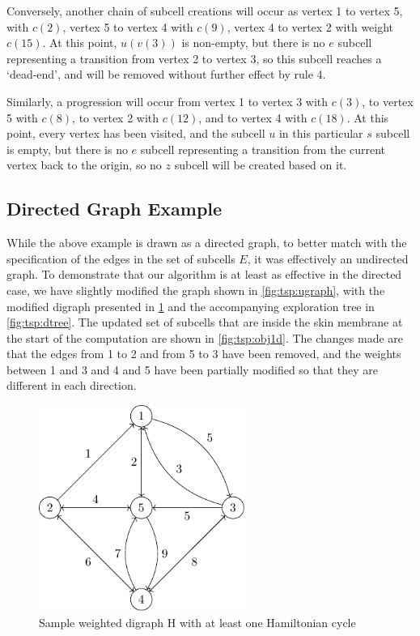 Conversely, another chain of subcell creations will occur as vertex 1 to vertex 5, with \(c(2)\), vertex 5 to vertex 4 with \(c(9)\), vertex 4 to vertex 2 with weight \(c(15)\).  At this point, \(u(v(3))\) is non-empty, but there is no \(e\) subcell representing a transition from vertex 2 to vertex 3, so this subcell reaches a `dead-end', and will be removed without further effect by rule 4.

Similarly, a progression will occur from vertex 1 to vertex 3 with \(c(3)\), to vertex 5 with \(c(8)\), to vertex 2 with \(c(12)\), and to vertex 4 with \(c(18)\).  At this point, every vertex has been visited, and the subcell \(u\) in this particular \(s\) subcell is empty, but there is no \(e\) subcell representing a transition from the current vertex back to the origin, so no \(z\) subcell will be created based on it.


\subsection{Directed Graph Example}
While the above example is drawn as a directed graph, to better match with the specification of the edges in the set of subcells \(E\), it was effectively an undirected graph.  To demonstrate that our algorithm is at least as effective in the directed case, we have slightly modified the graph shown in \cref{fig:tsp:ugraph}, with the modified digraph presented in \cref{fig:tsp:digraph} and the accompanying exploration tree in \cref{fig:tsp:dtree}.  The updated set of subcells that are inside the skin membrane at the start of the computation are shown in \cref{fig:tsp:obj1d}.  The changes made are that the edges from 1 to 2 and from 5 to 3 have been removed, and the weights between 1 and 3 and 4 and 5 have been partially modified so that they are different in each direction.

\begin{figure}
\centering
\includegraphics[width=0.6\textwidth]{chapters/tsp/figs/ugraph-figure2}
\caption{\label{fig:tsp:digraph}Sample weighted digraph H with at least one Hamiltonian cycle}
\end{figure}

